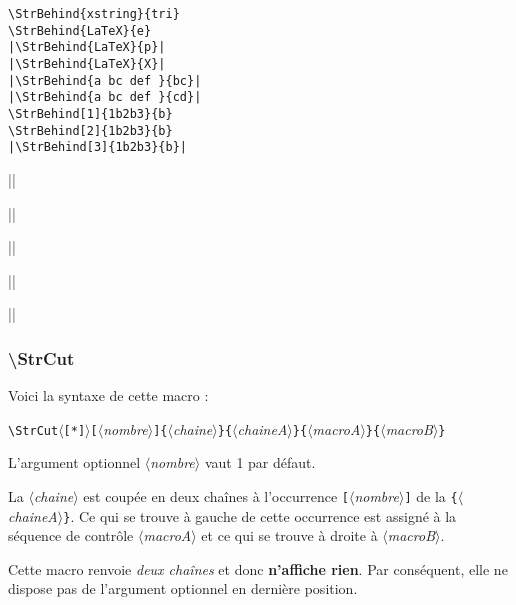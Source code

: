 \documentclass[a4paper,10pt]{article}
\newcommand\argu[1]{$\langle$\textit{#1}$\rangle$}
\newcommand\ARGU[1]{\texttt{\color{black}\{}\argu{#1}\texttt{\color{black}\}}}
\newcommand\arguC[1]{\texttt{\color{black}[}\argu{#1}\texttt{\color{black}]}}
\newcommand\etoile{$\langle$\texttt{[*]}$\rangle$}
\newcommand\styleexemple{\small\vskip4pt}
\newcommand\verbinline{\lstinline[basicstyle=\normalsize\ttfamily]}
\begin{document}
\begin{minipage}[t]{0.65\linewidth}
\begin{lstlisting}
\StrBehind{xstring}{tri}
\StrBehind{LaTeX}{e}
|\StrBehind{LaTeX}{p}|
|\StrBehind{LaTeX}{X}|
|\StrBehind{a bc def }{bc}|
|\StrBehind{a bc def }{cd}|
\StrBehind[1]{1b2b3}{b}
\StrBehind[2]{1b2b3}{b}
|\StrBehind[3]{1b2b3}{b}|
\end{lstlisting}%
\end{minipage}\hfill
\begin{minipage}[t]{0.35\linewidth}
	\styleexemple
	\par
	\par
	||\par
	||\par
	||\par
	||\par
	\par
	\par
	||
\end{minipage}%

\subsubsection{\ttfamily\textbackslash StrCut}
Voici la syntaxe de cette macro :\par\nobreak\smallskip
\verbinline|\StrCut|\etoile\arguC{nombre}\ARGU{chaine}\ARGU{chaineA}\ARGU{macroA}\ARGU{macroB}
\smallskip

L'argument optionnel \argu{nombre} vaut 1 par défaut.\par\nobreak\smallskip
La \argu{chaine} est coupée en deux chaînes à l'occurrence \no\arguC{nombre} de la \ARGU{chaineA}. Ce qui se trouve à gauche de cette occurrence est assigné à la séquence de contrôle \argu{macroA} et ce qui se trouve à droite à \argu{macroB}.

Cette macro renvoie \emph{deux chaînes} et donc \textbf{n'affiche rien}. Par conséquent, elle ne dispose pas de l'argument optionnel en dernière position.\medskip
\end{document}
